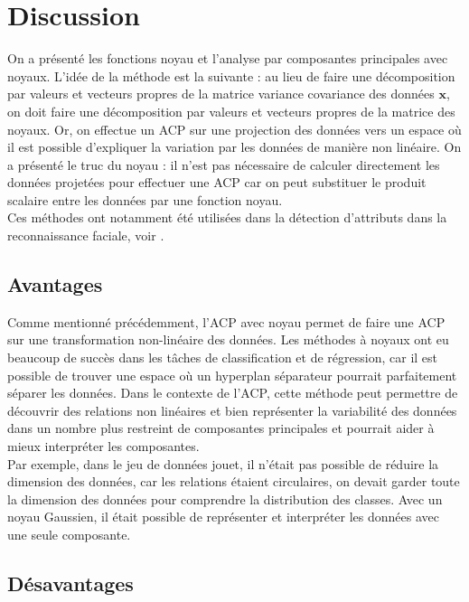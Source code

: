 \section{Discussion}

On a présenté les fonctions noyau et l'analyse par composantes principales avec noyaux. L'idée de la méthode est la suivante : au lieu de faire une décomposition par valeurs et vecteurs propres de la matrice variance covariance des données $\textbf{x}$, on doit faire une décomposition par valeurs et vecteurs propres de la matrice des noyaux. Or, on effectue un ACP sur une projection des données vers un espace où il est possible d'expliquer la variation par les données de manière non linéaire. On a présenté le truc du noyau : il n'est pas nécessaire de calculer directement les données projetées pour effectuer une ACP car on peut substituer le produit scalaire entre les données par une fonction noyau. \\

Ces méthodes ont notamment été utilisées dans la détection d'attributs dans la reconnaissance faciale, voir \cite{kim2002face}. 

\subsection{Avantages}

Comme mentionné précédemment, l'ACP avec noyau permet de faire une ACP sur une transformation non-linéaire des données. Les méthodes à noyaux ont eu beaucoup de succès dans les tâches de classification et de régression, car il est possible de trouver une espace où un hyperplan séparateur pourrait parfaitement séparer les données. Dans le contexte de l'ACP, cette méthode peut permettre de découvrir des relations non linéaires et bien représenter la variabilité des données dans un nombre plus restreint de composantes principales et pourrait aider à mieux interpréter les composantes. \\

Par exemple, dans le jeu de données jouet, il n'était pas possible de réduire la dimension des données, car les relations étaient circulaires, on devait garder toute la dimension des données pour comprendre la distribution des classes. Avec un noyau Gaussien, il était possible de représenter et interpréter les données avec une seule composante.

\subsection{Désavantages}

